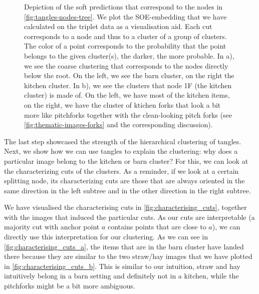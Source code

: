 \onecolumn
\begin{figure}[ht]
    \centering
    \hfill
    \caption{
        Depiction of the soft predictions that correspond to the nodes in \autoref{fig:tangles-nodes-tree}. 
        We plot the SOE-embedding that we have calculated on the triplet data as a visualisation aid. Each cut corresponds to a node and thus to a cluster
        of a group of clusters. The color of a point corresponds to the probability that
        the point belongs to the given cluster(s), the darker, the more probable. 
        In a), we see the coarse clustering that corresponds to the nodes directly below the root. On the left, we see the barn cluster, 
        on the right the kitchen cluster. In b), we see the clusters that node 1F (the kitchen cluster) is made of. On the left, we have
        most of the kitchen items, on the right, we have the cluster of ktichen forks that look a bit more like pitchforks together with the clean-looking
        pitch forks (see \autoref{fig:thematic-images-forks} and the corresponding discussion).
    }
    \label{fig:soft-clustering}
\end{figure}

The last step showcased the strength of the hierarchical clustering of tangles. Next, we show how we can use tangles to explain the clustering:
why does a particular image belong to the kitchen or barn cluster? For this, we can look at the characterizing cuts of the clusters. As a reminder, if we look at a certain splitting node, its characterizing cuts are those that are always oriented in the same direction in the left subtree and in the other direction in the right subtree. 

We have visualised the characterising cuts in \autoref{fig:characterising_cuts}, together with the images that induced the particular cuts. As our cuts are interpretable (a majority cut 
with anchor point $a$ contains points that are close to $a$), we can directly use this interpretation for our clustering. As we can see in \autoref{fig:characterising_cuts_a}, 
the items that are in the barn cluster have landed there because they are similar to the two straw/hay images that we have plotted in \autoref{fig:characterising_cuts_b}. This is similar to our intuition, straw and hay intuitively belong 
in a barn setting and definitely not in a kitchen, while the pitchforks might be a bit more ambiguous.

